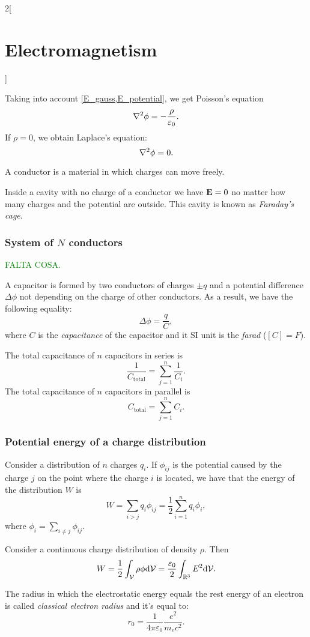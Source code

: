 \documentclass[../../../main.tex]{subfiles}
\begin{document}
\begin{multicols}{2}[\section{Electromagnetism}]
  \begin{prop}
    Taking into account \cref{E_gauss,E_potential}, we get Poisson's equation $$\laplacian\phi=-\frac{\rho}{\varepsilon_0}.$$ If $\rho=0$, we obtain Laplace's equation: $$\laplacian\phi=0.$$
  \end{prop}
  \begin{definition}
    A conductor is a material in which charges can move freely.
  \end{definition}
  \begin{prop}
    Inside a cavity with no charge of a conductor we have $\boldsymbol{\mathrm{E}}=0$ no matter how many charges and the potential are outside. This cavity is known as \emph{Faraday's cage}.
  \end{prop}
  \subsubsection{System of \texorpdfstring{$N$}{N} conductors}
  \textcolor{green}{FALTA COSA.}
  \begin{definition}[Capacitor]
    A capacitor is formed by two conductors of charges $\pm q$ and a potential difference $\Delta\phi$ not depending on the charge of other conductors. As a result, we have the following equality: $$\Delta\phi=\frac{q}{C},$$ where $C$ is the \emph{capacitance} of the capacitor and it SI unit is the \emph{farad} ($[C]=F$).
  \end{definition}
  \begin{prop}
    The total capacitance of $n$ capacitors in series is $$\frac{1}{C_\text{total}}=\sum_{j=1}^n\frac{1}{C_i}.$$
    The total capacitance of $n$ capacitors in parallel is $$C_\text{total}=\sum_{j=1}^nC_i.$$
  \end{prop}
  \subsubsection{Potential energy of a charge distribution}
  \begin{prop}
    Consider a distribution of $n$ charges $q_i$. If $\phi_{ij}$ is the potential caused by the charge $j$ on the point where the charge $i$ is located, we have that the energy of the distribution $W$ is $$W=\sum_{i>j}q_i\phi_{ij}=\frac{1}{2}\sum_{i=1}^nq_i\phi_i,$$ where $\displaystyle\phi_i=\sum_{i\ne j}\phi_{ij}$.
  \end{prop}
  \begin{prop}
    Consider a continuous charge distribution of density $\rho$. Then $$W=\frac{1}{2}\int_\mathcal{V}\rho\phi \dd \mathcal{V}=\frac{\varepsilon_0}{2}\int_{\mathbb{R}^3}E^2\dd \mathcal{V}.$$
  \end{prop}
  \begin{definition}
    The radius in which the electrostatic energy equals the rest energy of an electron is called \emph{classical electron radius} and it's equal to: $$r_0=\frac{1}{4\pi\varepsilon_0}\frac{e^2}{m_ec^2}.$$
  \end{definition}
\end{multicols}
\end{document}
